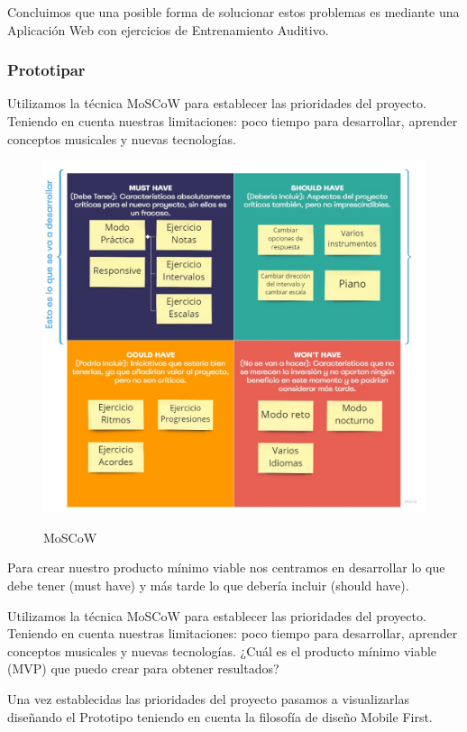 \documentclass[12pt,twoside,titlepage]{report}
\begin{document}
Concluimos que una posible forma de solucionar estos problemas es mediante una Aplicación Web con ejercicios de Entrenamiento Auditivo. 


\subsubsection{Prototipar}

Utilizamos la técnica MoSCoW para establecer las prioridades del proyecto. Teniendo en cuenta nuestras limitaciones: poco tiempo para desarrollar, aprender conceptos musicales y nuevas tecnologías. 

\begin{figure}[H]
    \centering
    \includegraphics[scale=0.35]{Design Thinking/MosCow}
    \label{fig:MoSCoW}
    \caption{MoSCoW}
\end{figure}

Para crear nuestro producto mínimo viable nos centramos en desarrollar lo que debe tener (must have) y más tarde lo que debería incluir (should have).

Utilizamos la técnica MoSCoW para establecer las prioridades del proyecto. Teniendo en cuenta nuestras limitaciones: poco tiempo para desarrollar, aprender conceptos musicales y nuevas tecnologías. ¿Cuál es el producto mínimo viable (MVP) que puedo crear para obtener resultados?

Una vez establecidas las prioridades del proyecto pasamos a visualizarlas diseñando el Prototipo teniendo en cuenta la filosofía de diseño Mobile First.
\end{document}
